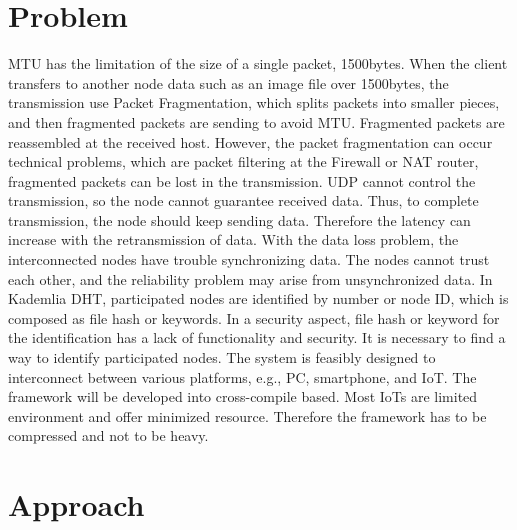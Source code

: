 \documentclass{article}
\begin{document}
\section{Problem}
MTU has the limitation of the size of a single packet, 1500bytes. When the client transfers to another node data such as an image file over 1500bytes, the transmission use Packet Fragmentation, which splits packets into smaller pieces, and then fragmented packets are sending to avoid MTU. Fragmented packets are reassembled at the received host. However, the packet fragmentation can occur technical problems, which are packet filtering at the Firewall or NAT router, fragmented packets can be lost in the transmission. UDP cannot control the transmission, so the node cannot guarantee received data. Thus, to complete transmission, the node should keep sending data. Therefore the latency can increase with the retransmission of data. With the data loss problem, the interconnected nodes have trouble synchronizing data. The nodes cannot trust each other, and the reliability problem may arise from unsynchronized data.
In Kademlia DHT, participated nodes are identified by number or node ID, which is composed as file hash or keywords. In a security aspect, file hash or keyword for the identification has a lack of functionality and security. It is necessary to find a way to identify participated nodes.
The system is feasibly designed to interconnect between various platforms, e.g., PC, smartphone, and IoT. The framework will be developed into cross-compile based. Most IoTs are limited environment and offer minimized resource. Therefore the framework has to be compressed and not to be heavy.

\section{Approach}
\end{document}
